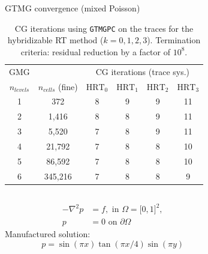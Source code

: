 \documentclass[9pt]{beamer}
\begin{document}
\begin{frame}[c]{GTMG convergence (mixed Poisson)}
	\begin{center}
		\begin{table}
			\caption{CG iterations using
				\texttt{GTMGPC} on the traces
				for the hybridizable RT method ($k=0, 1, 2, 3$).
				Termination criteria: residual
				reduction by a factor of $10^8$.}
			\vspace{-10pt}\begin{tabular}{||c| c c c c c||} 
				\hline
				GMG & & \multicolumn{4}{c||}{CG iterations (trace sys.)} \\
				$n_{levels}$ & $n_{cells}$ (fine) &
				$\mathrm{HRT}_0$ & $\mathrm{HRT}_1$
				& $\mathrm{HRT}_2$
				& $\mathrm{HRT}_3$ \\ [0.5ex] 
				\hline\hline
				1 & 372     & 8 & 9 & 9 & 11\\ 
				\hline
				2 & 1,416   & 8 & 8 & 9 & 11\\
				\hline
				3 & 5,520   & 7 & 8 & 9 & 11\\
				\hline
				4 & 21,792  & 7 & 8 & 8 & 10\\
				\hline
				5 & 86,592  & 7 & 8 & 8 & 10\\
				\hline
				6 & 345,216 & 7 & 8 & 8 & 9\\ [1ex] 
				\hline
			\end{tabular}
		\end{table}
	\end{center}
	\vspace{-5pt}\begin{columns}
	\begin{column}{0.5\textwidth}
		\begin{tcolorbox}[colback=blue!5!white,colframe=mDarkTeal,title=Poisson example]
		\vspace{-15pt}\begin{align*}
		-\nabla^2 p &= f, \text{ in } \Omega = \lbrack 0, 1 \rbrack^2,\\
		p &= 0 \text{ on } \partial\Omega
		\end{align*}
		Manufactured solution:
		\vspace{-5pt}\begin{equation*}
			p = \sin(\pi x)\tan(\pi x/4)\sin(\pi y)
		\end{equation*}
	\end{tcolorbox}	
	\end{column}
	\begin{column}{0.5\textwidth}
		\vspace{-5pt}\begin{center}

\end{center}
\end{column}
\end{columns}
\end{frame}
\end{document}
